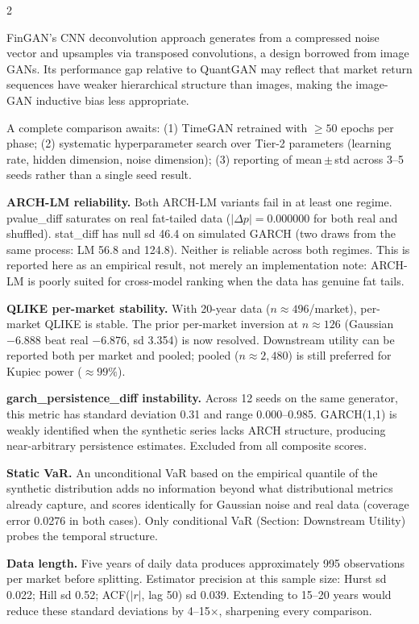 \documentclass[10pt]{article}
\newcommand{\redbox}[2]{\begin{tcolorbox}[mybox={DRed}{RBg},title={#1}]#2\end{tcolorbox}}
\begin{document}
\begin{multicols}{2}
{FinGAN's CNN deconvolution approach generates from a compressed noise vector and upsamples via transposed convolutions, a design borrowed from image GANs. Its performance gap relative to QuantGAN may reflect that market return sequences have weaker hierarchical structure than images, making the image-GAN inductive bias less appropriate.

A complete comparison awaits: (1) TimeGAN retrained with $\geq 50$ epochs per phase; (2) systematic hyperparameter search over Tier-2 parameters (learning rate, hidden dimension, noise dimension); (3) reporting of mean\,$\pm$\,std across 3--5 seeds rather than a single seed result.}

\columnbreak

\redbox{Known Failure Modes and Limitations}{%
\textbf{ARCH-LM reliability.} Both ARCH-LM variants fail in at least one regime. pvalue\_diff saturates on real fat-tailed data ($|\Delta p| = 0.000000$ for both real and shuffled). stat\_diff has null sd 46.4 on simulated GARCH (two draws from the same process: LM 56.8 and 124.8). Neither is reliable across both regimes. This is reported here as an empirical result, not merely an implementation note: ARCH-LM is poorly suited for cross-model ranking when the data has genuine fat tails.

\textbf{QLIKE per-market stability.} With 20-year data ($n\approx496$/market), per-market QLIKE is stable. The prior per-market inversion at $n\approx126$ (Gaussian $-6.888$ beat real $-6.876$, sd 3.354) is now resolved. Downstream utility can be reported both per market and pooled; pooled ($n\approx2{,}480$) is still preferred for Kupiec power ($\approx99\%$).

\textbf{garch\_persistence\_diff instability.} Across 12 seeds on the same generator, this metric has standard deviation 0.31 and range 0.000--0.985. GARCH(1,1) is weakly identified when the synthetic series lacks ARCH structure, producing near-arbitrary persistence estimates. Excluded from all composite scores.

\textbf{Static VaR.} An unconditional VaR based on the empirical quantile of the synthetic distribution adds no information beyond what distributional metrics already capture, and scores identically for Gaussian noise and real data (coverage error 0.0276 in both cases). Only conditional VaR (Section: Downstream Utility) probes the temporal structure.

\textbf{Data length.} Five years of daily data produces approximately 995 observations per market before splitting. Estimator precision at this sample size: Hurst sd 0.022; Hill sd 0.52; ACF($|r|$, lag 50) sd 0.039. Extending to 15--20 years would reduce these standard deviations by 4--15$\times$, sharpening every comparison.}


\end{multicols}
\end{document}
